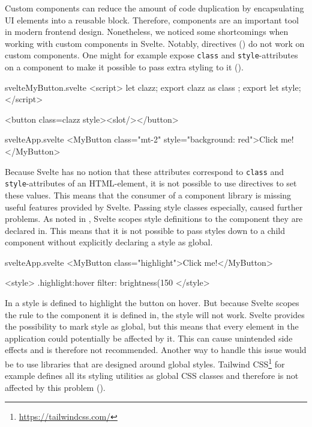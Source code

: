 Custom components can reduce the amount of code duplication by encapsulating UI elements into a reusable block. Therefore, components are an important tool in modern frontend design. Nonetheless, we noticed some shortcomings when working with custom components in Svelte. Notably, directives () do not work on custom components. One might for example expose \texttt{class} and \texttt{style}-attributes on a component to make it possible to pass extra styling to it ().

\begin{listing}[H]
\begin{myminted}{svelte}{MyButton.svelte}
<script>
  let clazz;
  export { clazz as class };
  export let style;
</script>

<button class={clazz} {style}><slot/></button>
\end{myminted}
\begin{myminted}{svelte}{App.svelte}
<MyButton class="mt-2" style="background: red">Click me!</MyButton>
\end{myminted}
\caption{Svelte Component that provides a class and style attribute.}
\label{fig:evaluation-svelte-component-style}
\end{listing}

Because Svelte has no notion that these attributes correspond to \texttt{class} and \texttt{style}-attributes of an HTML-element, it is not possible to use directives to set these values. This means that the consumer of a component library is missing useful features provided by Svelte. Passing style classes especially, caused further problems. As noted in , Svelte scopes style definitions to the component they are declared in. This means that it is not possible to pass styles down to a child component without explicitly declaring a style as global.

\begin{listing}[H]
\begin{myminted}{svelte}{App.svelte}
<MyButton class="highlight">Click me!</MyButton>

<style>
  .highlight:hover {
    filter: brightness(150%
  }
</style>
\end{myminted}
\caption{The style will not apply to the custom component because it is scoped.}
\label{fig:evaluation-styling-scope}
\end{listing}

In  a style is defined to highlight the button on hover. But because Svelte scopes the rule to the component it is defined in, the style will not work. Svelte provides the possibility to mark style as global, but this means that every element in the application could potentially be affected by it. This can cause unintended side effects and is therefore not recommended. Another way to handle this issue would be to use libraries that are designed around global styles. Tailwind CSS\footnote{\url{https://tailwindcss.com/}} for example defines all its styling utilities as global CSS classes and therefore is not affected by this problem ().

